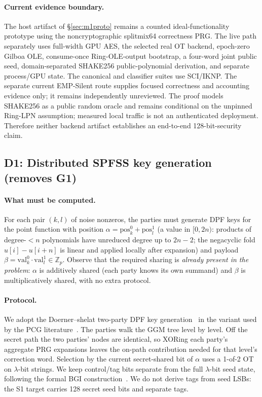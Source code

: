 \documentclass[11pt]{article}
\newcommand{\Z}{\mathbb{Z}}
\begin{document}
\paragraph{Current evidence boundary.} The host artifact of
\S\ref{sec:m1proto} remains a counted ideal-functionality prototype using the
noncryptographic splitmix64 correctness PRG.
The live path separately uses full-width GPU AES, the selected real OT backend,
epoch-zero Gilboa OLE, consume-once Ring-OLE-output bootstrap, a four-word
joint public seed, domain-separated SHAKE256 public-polynomial derivation, and
separate process/GPU state. The canonical and classifier suites use SCI/IKNP.
The separate current EMP-Silent route supplies focused correctness and
accounting evidence only; it remains independently unreviewed. The proof models
SHAKE256 as a public random oracle and remains
conditional on the unpinned Ring-LPN assumption; measured local traffic is not
an authenticated deployment. Therefore neither backend artifact establishes
an end-to-end 128-bit-security claim.

\subsection{D1: Distributed SPFSS key generation (removes G1)}
\label{sec:design-keygen}

\paragraph{What must be computed.} For each pair $(k,l)$ of noise nonzeros,
the parties must generate DPF keys for the point function with position
$\alpha = \mathrm{pos}^0_k + \mathrm{pos}^1_l$ (a value in $[0, 2n)$: products
of degree-$<n$ polynomials have unreduced degree up to $2n-2$; the negacyclic
fold $u[i] - u[i+n]$ is linear and applied locally after expansion) and
payload $\beta = \mathrm{val}^0_k \cdot \mathrm{val}^1_l \in \Z_p$. Observe
that the required sharing is \emph{already present in the problem}: $\alpha$
is additively shared (each party knows its own summand) and $\beta$ is
multiplicatively shared, with no extra protocol.

\paragraph{Protocol.} We adopt the Doerner--shelat two-party DPF key
generation~\cite{doerner2017floram} in the variant used by the PCG
literature~\cite{boyle2019efficient,boyle2020ringlpn}. The parties walk the
GGM tree level by level. Off the secret path the two parties' nodes are
identical, so XORing each party's aggregate PRG expansions leaves the on-path
contribution needed for that level's correction word. Selection by the
current secret-shared bit of $\alpha$ uses a 1-of-2 OT on
$\lambda$-bit strings. We keep control/tag bits separate from the full
$\lambda$-bit seed state, following the formal BGI
construction~\cite{boyle2016fss}. We do not derive tags from seed LSBs: the
S1 target carries 128 secret seed bits and separate tags.
\end{document}

